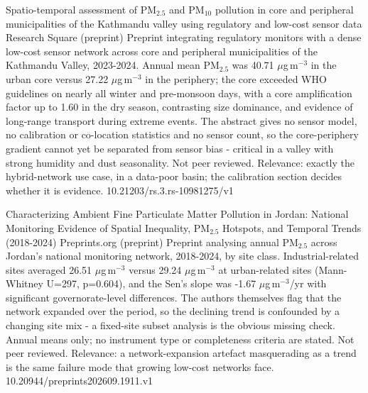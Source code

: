 \documentclass[10pt]{article}
\begin{document}

{Spatio-temporal assessment of PM$_{2.5}$ and PM$_{10}$ pollution in core and peripheral municipalities of the Kathmandu valley using regulatory and low-cost sensor data}
{Research Square (preprint)}
{Preprint integrating regulatory monitors with a dense low-cost sensor network across core and peripheral municipalities of the Kathmandu Valley, 2023-2024. Annual mean PM$_{2.5}$ was 40.71 $\mu$g\,m$^{-3}$ in the urban core versus 27.22 $\mu$g\,m$^{-3}$ in the periphery; the core exceeded WHO guidelines on nearly all winter and pre-monsoon days, with a core amplification factor up to 1.60 in the dry season, contrasting size dominance, and evidence of long-range transport during extreme events. The abstract gives no sensor model, no calibration or co-location statistics and no sensor count, so the core-periphery gradient cannot yet be separated from sensor bias - critical in a valley with strong humidity and dust seasonality. Not peer reviewed. Relevance: exactly the hybrid-network use case, in a data-poor basin; the calibration section decides whether it is evidence.}
{10.21203/rs.3.rs-10981275/v1}

{Characterizing Ambient Fine Particulate Matter Pollution in Jordan: National Monitoring Evidence of Spatial Inequality, PM$_{2.5}$ Hotspots, and Temporal Trends (2018-2024)}
{Preprints.org (preprint)}
{Preprint analysing annual PM$_{2.5}$ across Jordan's national monitoring network, 2018-2024, by site class. Industrial-related sites averaged 26.51 $\mu$g\,m$^{-3}$ versus 29.24 $\mu$g\,m$^{-3}$ at urban-related sites (Mann-Whitney U=297, p=0.604), and the Sen's slope was -1.67 $\mu$g\,m$^{-3}$/yr with significant governorate-level differences. The authors themselves flag that the network expanded over the period, so the declining trend is confounded by a changing site mix - a fixed-site subset analysis is the obvious missing check. Annual means only; no instrument type or completeness criteria are stated. Not peer reviewed. Relevance: a network-expansion artefact masquerading as a trend is the same failure mode that growing low-cost networks face.}
{10.20944/preprints202609.1911.v1}
\end{document}
